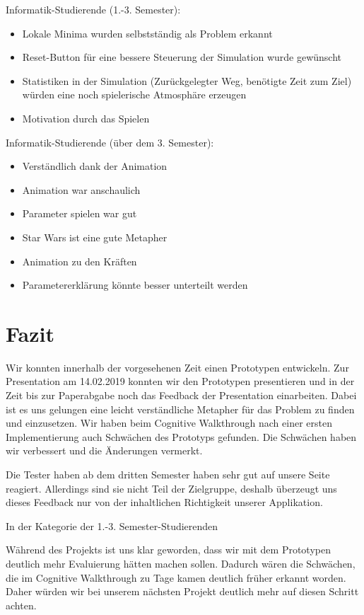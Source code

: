 Informatik-Studierende (1.-3. Semester):
\begin{itemize}
	\item Lokale Minima wurden selbstständig als Problem erkannt
	\item Reset-Button für eine bessere Steuerung der Simulation wurde gewünscht
	\item Statistiken in der Simulation (Zurückgelegter Weg, benötigte Zeit zum Ziel) würden eine noch spielerische Atmosphäre erzeugen
	\item Motivation durch das Spielen
\end{itemize}

Informatik-Studierende (über dem  3. Semester):
\begin{itemize}
	\item Verständlich dank der Animation
	\item Animation war anschaulich
	\item Parameter spielen war gut
	\item Star Wars ist eine gute Metapher
	\item Animation zu den Kräften %
	\item Parametererklärung könnte besser unterteilt werden
\end{itemize}


\section{Fazit}
Wir konnten innerhalb der vorgesehenen Zeit einen Prototypen entwickeln.
Zur Presentation am 14.02.2019 konnten wir den Prototypen presentieren und in der Zeit bis zur Paperabgabe noch das Feedback der Presentation einarbeiten.
Dabei ist es uns gelungen eine leicht verständliche Metapher für das Problem zu finden und einzusetzen. 
Wir haben beim Cognitive Walkthrough nach einer ersten Implementierung auch Schwächen des Prototyps gefunden. 
Die Schwächen haben wir verbessert und die Änderungen vermerkt.

Die Tester haben ab dem dritten Semester haben sehr gut auf unsere Seite reagiert. Allerdings sind sie nicht Teil der Zielgruppe, deshalb überzeugt uns dieses Feedback nur von der inhaltlichen Richtigkeit unserer Applikation.

In der Kategorie der 1.-3. Semester-Studierenden %

Während des Projekts ist uns klar geworden, dass wir mit dem Prototypen deutlich mehr Evaluierung hätten machen sollen. 
Dadurch wären die Schwächen, die im Cognitive Walkthrough zu Tage kamen deutlich früher erkannt worden.
Daher würden wir bei unserem nächsten Projekt deutlich mehr auf diesen Schritt achten.


